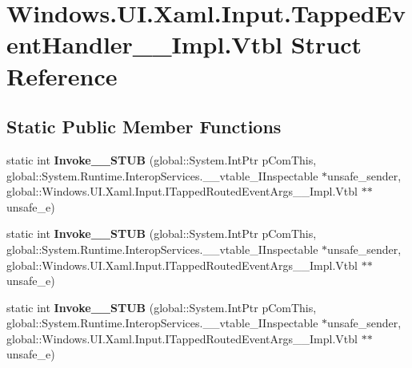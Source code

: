 \hypertarget{struct_windows_1_1_u_i_1_1_xaml_1_1_input_1_1_tapped_event_handler_____impl_1_1_vtbl}{}\section{Windows.\+U\+I.\+Xaml.\+Input.\+Tapped\+Event\+Handler\+\_\+\+\_\+\+Impl.\+Vtbl Struct Reference}
\label{struct_windows_1_1_u_i_1_1_xaml_1_1_input_1_1_tapped_event_handler_____impl_1_1_vtbl}
\subsection*{Static Public Member Functions}
\begin{DoxyCompactItemize}
\item 
\mbox{\label{struct_windows_1_1_u_i_1_1_xaml_1_1_input_1_1_tapped_event_handler_____impl_1_1_vtbl_a1804705a200073a49be87729974ad18e}} 
static int {\bfseries Invoke\+\_\+\+\_\+\+S\+T\+UB} (global\+::\+System.\+Int\+Ptr p\+Com\+This, global\+::\+System.\+Runtime.\+Interop\+Services.\+\_\+\+\_\+vtable\+\_\+\+I\+Inspectable $\ast$unsafe\+\_\+sender, global\+::\+Windows.\+U\+I.\+Xaml.\+Input.\+I\+Tapped\+Routed\+Event\+Args\+\_\+\+\_\+\+Impl.\+Vtbl $\ast$$\ast$unsafe\+\_\+e)
\item 
\mbox{\label{struct_windows_1_1_u_i_1_1_xaml_1_1_input_1_1_tapped_event_handler_____impl_1_1_vtbl_a1804705a200073a49be87729974ad18e}} 
static int {\bfseries Invoke\+\_\+\+\_\+\+S\+T\+UB} (global\+::\+System.\+Int\+Ptr p\+Com\+This, global\+::\+System.\+Runtime.\+Interop\+Services.\+\_\+\+\_\+vtable\+\_\+\+I\+Inspectable $\ast$unsafe\+\_\+sender, global\+::\+Windows.\+U\+I.\+Xaml.\+Input.\+I\+Tapped\+Routed\+Event\+Args\+\_\+\+\_\+\+Impl.\+Vtbl $\ast$$\ast$unsafe\+\_\+e)
\item 
\mbox{\label{struct_windows_1_1_u_i_1_1_xaml_1_1_input_1_1_tapped_event_handler_____impl_1_1_vtbl_a1804705a200073a49be87729974ad18e}} 
static int {\bfseries Invoke\+\_\+\+\_\+\+S\+T\+UB} (global\+::\+System.\+Int\+Ptr p\+Com\+This, global\+::\+System.\+Runtime.\+Interop\+Services.\+\_\+\+\_\+vtable\+\_\+\+I\+Inspectable $\ast$unsafe\+\_\+sender, global\+::\+Windows.\+U\+I.\+Xaml.\+Input.\+I\+Tapped\+Routed\+Event\+Args\+\_\+\+\_\+\+Impl.\+Vtbl $\ast$$\ast$unsafe\+\_\+e)
$$
\end{DoxyCompactItemize}
